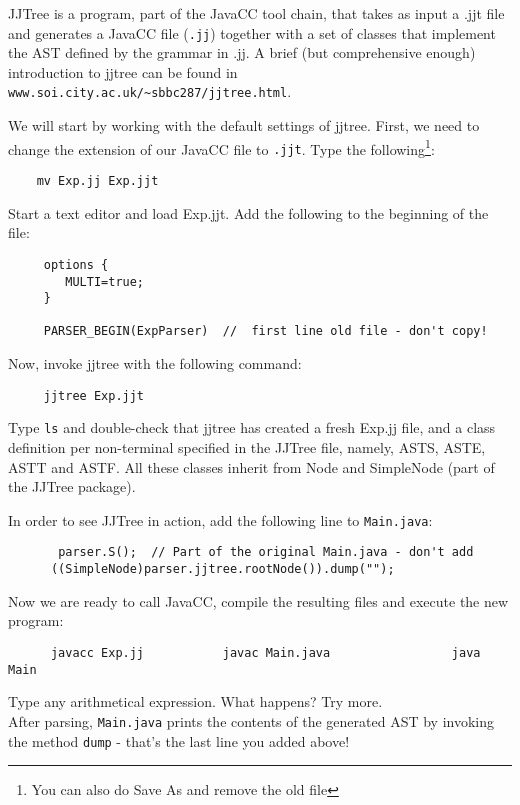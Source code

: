 \documentclass{article}
\begin{document}
JJTree is a program, part of the JavaCC tool chain, that takes as input a {.jjt} file and generates a JavaCC file ({\tt .jj}) together with a set of classes that implement the AST defined by the grammar in {.jj}. A brief (but comprehensive enough) introduction to jjtree can be found in \verb+www.soi.city.ac.uk/~sbbc287/jjtree.html+.

We will start by working with the default settings of jjtree. First, we need to change the extension of our JavaCC file to {\tt .jjt}. Type the following\footnote{You can also do Save As and remove the old file}:

\begin{verbatim}
    mv Exp.jj Exp.jjt
\end{verbatim}

Start a text editor and load {Exp.jjt}. Add the following to the beginning of the file:
\begin{verbatim}
     options {
        MULTI=true;
     }

     PARSER_BEGIN(ExpParser)  //  first line old file - don't copy!
\end{verbatim}
Now, invoke jjtree with the following command:

\begin{verbatim}
     jjtree Exp.jjt
\end{verbatim}

Type {\tt ls} and double-check that jjtree has created a fresh {Exp.jj} file, and a class definition per non-terminal specified in the JJTree file, namely, ASTS, ASTE, ASTT and ASTF. All these classes inherit from  Node and SimpleNode (part of the JJTree package).

In order to see JJTree in action, add the following line to {\tt Main.java}:

\begin{verbatim}
       parser.S();  // Part of the original Main.java - don't add
      ((SimpleNode)parser.jjtree.rootNode()).dump("");
\end{verbatim}

Now we are ready to call JavaCC, compile the resulting files and execute the new program:

\begin{verbatim}
      javacc Exp.jj           javac Main.java                 java Main      
\end{verbatim}

Type any arithmetical expression. What happens? Try more.\\
After parsing, {\tt Main.java} prints the contents of the generated AST by invoking the method {\tt dump} - that's the last line you added above!
\end{document}
